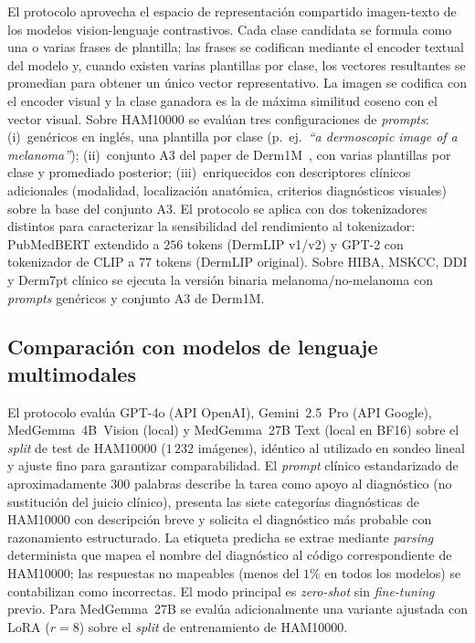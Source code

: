 El protocolo aprovecha el espacio de representación compartido
imagen-texto de los modelos vision-lenguaje contrastivos. Cada
clase candidata se formula como una o varias frases de plantilla;
las frases se codifican mediante el encoder textual del modelo y,
cuando existen varias plantillas por clase, los vectores resultantes
se promedian para obtener un único vector representativo. La imagen
se codifica con el encoder visual y la clase ganadora es la de
máxima similitud coseno con el vector visual. Sobre HAM10000 se
evalúan tres configuraciones de \emph{prompts}: (i)~genéricos en
inglés, una plantilla por clase
(p.~ej.~\emph{``a dermoscopic image of a melanoma''});
(ii)~conjunto A3 del paper de Derm1M~\cite{derm1m}, con varias
plantillas por clase y promediado posterior; (iii)~enriquecidos con
descriptores clínicos adicionales (modalidad, localización
anatómica, criterios diagnósticos visuales) sobre la base del
conjunto A3. El protocolo se aplica con dos tokenizadores distintos
para caracterizar la sensibilidad del rendimiento al tokenizador:
PubMedBERT extendido a $256$ tokens (DermLIP v1/v2) y GPT-2 con
tokenizador de CLIP a $77$ tokens (DermLIP original). Sobre HIBA,
MSKCC, DDI y Derm7pt clínico se ejecuta la versión binaria
melanoma/no-melanoma con \emph{prompts} genéricos y conjunto A3 de
Derm1M.

\subsection{Comparación con modelos de lenguaje multimodales}
\label{sec:llm}

El protocolo evalúa GPT-4o (API OpenAI), Gemini~2.5~Pro (API
Google), MedGemma~4B~Vision (local) y MedGemma~27B Text (local en
BF16) sobre el \emph{split} de test de HAM10000 ($1\,232$
imágenes), idéntico al utilizado en sondeo lineal y ajuste fino
para garantizar comparabilidad. El \emph{prompt} clínico
estandarizado de aproximadamente $300$ palabras describe la
tarea como apoyo al diagnóstico (no sustitución del juicio
clínico), presenta las siete categorías diagnósticas de HAM10000
con descripción breve y solicita el diagnóstico más probable con
razonamiento estructurado. La etiqueta predicha se extrae mediante
\emph{parsing} determinista que mapea el nombre del diagnóstico al
código correspondiente de HAM10000; las respuestas no mapeables
(menos del $1\%$ en todos los modelos) se contabilizan como
incorrectas. El modo principal es \emph{zero-shot} sin
\emph{fine-tuning} previo. Para MedGemma~27B se evalúa
adicionalmente una variante ajustada con LoRA ($r = 8$) sobre el
\emph{split} de entrenamiento de HAM10000.

